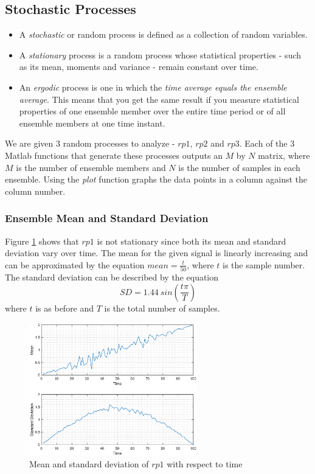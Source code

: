 \pagebreak

\subsection{Stochastic Processes}

\begin{itemize}
\item A \textit{stochastic} or random process is defined as a collection of random variables.

\item A \textit{stationary} process is a random process whose statistical properties - such as its mean, moments and variance - remain constant over time.

\item An \textit{ergodic} process is one in which the \textit{time average equals the ensemble average}. This means that you get the same result if you measure statistical properties of one ensemble member over the entire time period or of all ensemble members at one time instant.
\end{itemize}

We are given 3 random processes to analyze - $rp1$, $rp2$ and $rp3$. Each of the 3 Matlab functions that generate these processes outputs an $M$ by $N$ matrix, where $M$ is the number of ensemble members and $N$ is the number of samples in each ensemble. Using the \textit{plot} function graphs the data points in a column against the column number.

\pagebreak

\subsubsection{Ensemble Mean and Standard Deviation}

Figure \ref{fig:ergodic_rp1} shows that $rp1$ is not stationary since both its mean and standard deviation vary over time. The mean for the given signal is linearly increasing and can be approximated by the equation $mean = \frac{t}{50}$, where $t$ is the sample number. The standard deviation can be described by the equation $$ SD = 1.44 \ sin(\frac{t\pi}{T})$$ where $t$ is as before and $T$ is the total number of samples.\\

\begin{figure}[h!]
\centering
\includegraphics[width=0.65\textwidth]{ergodic_rp1}
\caption{\label{fig:ergodic_rp1} Mean and standard deviation of $rp1$ with respect to time}
\end{figure}

